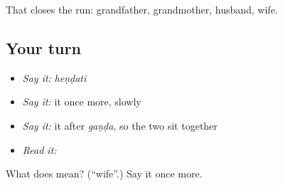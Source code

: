 \begin{grammarlens}[title={What you've built}]
That closes the run: grandfather, grandmother, husband, wife.
\end{grammarlens}

\subsection*{Your turn}
\begin{itemize}
\raggedright
  \item \emph{Say it:} \emph{heṇḍati}
  \item \emph{Say it:} it once more, slowly
  \item \emph{Say it:} it after \emph{gaṇḍa}, so the two sit together
  \item \emph{Read it:} \textbf{}
\end{itemize}

\begin{tcolorbox}[breakable,colback=teal!4,colframe=teal!35!black,title={Before you move on}]
What does  mean? (\textquotedblleft{}wife\textquotedblright{}.) Say it once more.
\end{tcolorbox}
